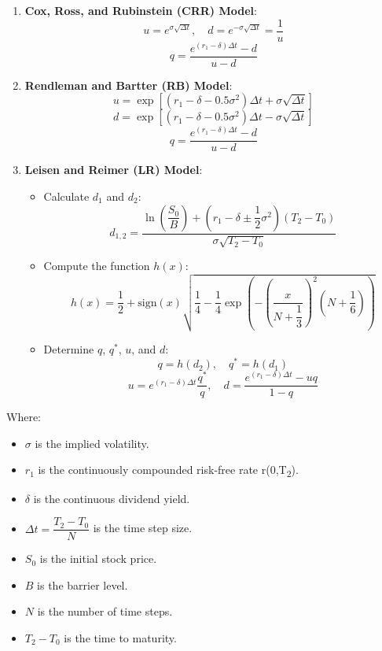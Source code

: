 \documentclass[12pt,a4paper]{article}
\begin{document}
\begin{enumerate}
    \item \textbf{Cox, Ross, and Rubinstein (CRR) Model}:
    \[
    u = e^{\sigma \sqrt{\Delta t}}, \quad d = e^{-\sigma \sqrt{\Delta t}} = \frac{1}{u}
    \]
    \[
    q = \frac{e^{(r_1 - \delta) \Delta t} - d}{u - d}
    \]
    
    \item \textbf{Rendleman and Bartter (RB) Model}:
    \[
    u = \exp\left[(r_1 - \delta - 0.5 \sigma^2) \Delta t + \sigma \sqrt{\Delta t}\right]
    \]
    \[
    d = \exp\left[(r_1 - \delta - 0.5 \sigma^2) \Delta t - \sigma \sqrt{\Delta t}\right]
    \]
    \[
    q = \frac{e^{(r_1 - \delta) \Delta t} - d}{u - d}
    \]
    
    \item \textbf{Leisen and Reimer (LR) Model}:
    \begin{itemize}
        \item Calculate \( d_1 \) and \( d_2 \):
        \[
        d_{1,2} = \frac{\ln\left(\dfrac{S_0}{B}\right) + \left(r_1 - \delta \pm \dfrac{1}{2} \sigma^2\right) (T_2 - T_0)}{\sigma \sqrt{T_2 - T_0}}
        \]
        \item Compute the function \( h(x) \):
        \[
        h(x) = \dfrac{1}{2} + \text{sign}(x) \sqrt{\dfrac{1}{4} - \dfrac{1}{4} \exp\left(-\left(\dfrac{x}{N + \dfrac{1}{3}}\right)^2 \left(N + \dfrac{1}{6}\right)\right)}
        \]
        \item Determine \( q \), \( q^* \), \( u \), and \( d \):
        \[
        q = h(d_2), \quad q^* = h(d_1)
        \]
        \[
        u = e^{(r_1 - \delta) \Delta t} \dfrac{q^*}{q}, \quad d = \dfrac{e^{(r_1 - \delta) \Delta t} - u q}{1 - q}
        \]
    \end{itemize}
\end{enumerate}

\noindent Where:

\begin{itemize}
    \item \( \sigma \) is the implied volatility.
    \item \( r_1 \) is the continuously compounded risk-free rate r(0,T\textsubscript{2}).
    \item \( \delta \) is the continuous dividend yield.
    \item \( \Delta t = \dfrac{T_2 - T_0}{N} \) is the time step size.
    \item \( S_0 \) is the initial stock price.
    \item \( B \) is the barrier level.
    \item \( N \) is the number of time steps.
    \item \( T_2 - T_0 \) is the time to maturity.
\end{itemize}
\end{document}

